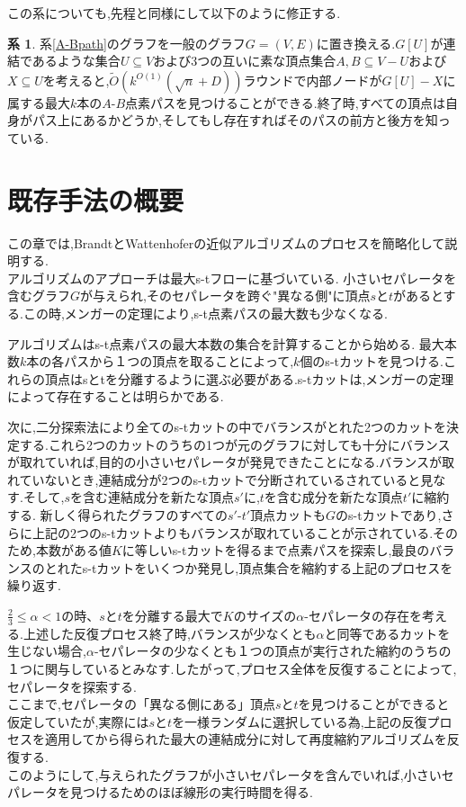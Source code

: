 \documentclass{thesis}
\theoremstyle{definition}
\newtheorem{corollary}{系}
\begin{document}
この系についても,先程と同様にして以下のように修正する.

\begin{corollary}
    系\ref{A-Bpath}のグラフを一般のグラフ$G =(V,E)$に置き換える.$G[U]$が連結であるような集合$U \subseteq V$および3つの互いに素な頂点集合$A,B \subseteq V - U$および$X \subseteq U$を考えると,$\tilde{O}(k^{O(1)}(\sqrt{n}+D))$ラウンドで内部ノードが$G[U] - X$に属する最大$k$本の$A$-$B$点素パスを見つけることができる.終了時,すべての頂点は自身がパス上にあるかどうか,そしてもし存在すればそのパスの前方と後方を知っている.
\end{corollary}


\chapter{既存手法の概要}

この章では,BrandtとWattenhoferの近似アルゴリズム\cite{brandt2017approximating}のプロセスを簡略化して説明する.\\

アルゴリズムのアプローチは最大s-tフローに基づいている.
小さいセパレータを含むグラフ$G$が与えられ,そのセパレータを跨ぐ"異なる側"に頂点$s$と$t$があるとする.この時,メンガーの定理により,s-t点素パスの最大数も少なくなる.\par
アルゴリズムはs-t点素パスの最大本数の集合を計算することから始める.
最大本数$k$本の各パスから１つの頂点を取ることによって,$k$個のs-tカットを見つける.これらの頂点はsとtを分離するように選ぶ必要がある.s-tカットは,メンガーの定理によって存在することは明らかである.\par

次に,二分探索法により全てのs-tカットの中でバランスがとれた2つのカットを決定する.これら2つのカットのうちの1つが元のグラフに対しても十分にバランスが取れていれば,目的の小さいセパレータが発見できたことになる.バランスが取れていないとき,連結成分が2つのs-tカットで分断されているされていると見なす.そして,$s$を含む連結成分を新たな頂点$s'$に,$t$を含む成分を新たな頂点$t'$に縮約する.
新しく得られたグラフのすべての$s'$-$t'$頂点カットも$G$のs-tカットであり,さらに上記の2つのs-tカットよりもバランスが取れていることが示されている.そのため,本数がある値$K$に等しいs-tカットを得るまで点素パスを探索し,最良のバランスのとれたs-tカットをいくつか発見し,頂点集合を縮約する上記のプロセスを繰り返す.\par

$\frac{2}{3} \leq \alpha < 1$の時、$s$と$t$を分離する最大で$K$のサイズの$\alpha$-セパレータの存在を考える.上述した反復プロセス終了時,バランスが少なくとも$\alpha$と同等であるカットを生じない場合,$\alpha$-セパレータの少なくとも１つの頂点が実行された縮約のうちの１つに関与しているとみなす.したがって,プロセス全体を反復することによって,セパレータを探索する.\\
ここまで,セパレータの「異なる側にある」頂点$s$と$t$を見つけることができると仮定していたが,実際には$s$と$t$を一様ランダムに選択している為,上記の反復プロセスを適用してから得られた最大の連結成分に対して再度縮約アルゴリズムを反復する.\\
このようにして,与えられたグラフが小さいセパレータを含んでいれば,小さいセパレータを見つけるためのほぼ線形の実行時間を得る.\par
\end{document}

